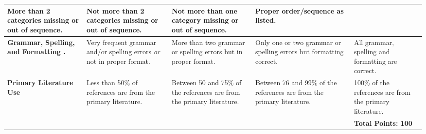 \documentclass[10pt, twoside]{article}
\begin{document}
\begin{landscape}
{\begin{longtable}[l]{@{}L{5cm}L{4cm}L{4cm}L{4cm}L{4cm}@{}}
More than 2 categories missing or out of sequence. &%
Not more than 2 categories missing or out of sequence. &%
Not more than one category missing or out of sequence. &%
Proper order/sequence as listed.\\
\midrule
\textbf{Grammar, Spelling, and Formatting	.} &%
Very frequent grammar and/or spelling errors \textit{or} not in proper format. &%
More than two grammar or spelling errors but in proper format. &%
Only one or two grammar or spelling errors but formatting correct. &%
All grammar, spelling and formatting are correct.\\
\midrule
\textbf{Primary Literature Use} &%
Less than 50\% of references are from the primary literature. &%
Between 50 and 75\% of the references are from the primary literature. &%
Between 76 and 99\% of the references are from the primary literature. &%
100\% of the references are from the primary literature.\\
\midrule
 & & & & \textbf{Total Points: 100} \\
\end{longtable}
}%

\end{landscape}
\end{document}
